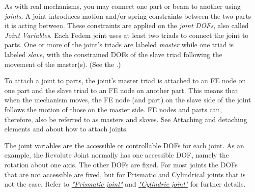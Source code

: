 %
%

%
%


As with real mechanisms, you may connect one part or beam to another using
{\sl joints}. A joint introduces motion and/or spring constraints between the
two parts it is acting between. These constraints are applied on the
{\sl joint DOFs}, also called {\sl Joint Variables}.
Each Fedem joint uses at least two triads to connect the joint to parts.
One or more of the joint's triads are labeled {\sl master} while one triad
is labeled {\sl slave}, with the constrained DOFs of the slave triad following
the movement of the master(s).
(See the .)

To attach a joint to parts, the joint's master triad is attached
to an FE node on one part and the slave triad to an FE node on another part.
This means that when the mechanism moves, the FE node (and part) on the slave
side of the joint follows the motion of those on the master side.
FE nodes and parts can, therefore, also be referred to as masters and slaves.
See 
{Attaching and detaching elements} and
about how to attach joints.




The joint variables are the accessible or controllable DOFs for each joint.
As an example, the Revolute Joint normally has one accessible DOF,
namely the rotation about one axis. The other DOFs are fixed.
For most joints the DOFs that are not accessible are fixed,
but for Prismatic and Cylindrical joints that is not the case.
Refer to \protect\hyperlink{prismatic-joint}{\sl"Prismatic joint"} and
\protect\hyperlink{cylindric-joint}{\sl"Cylindric joint"} for further details.

